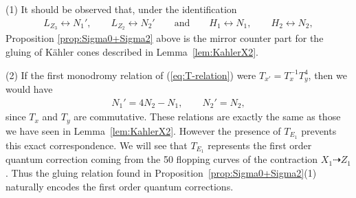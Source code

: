 \documentclass[pdftex]{sigma}
\numberwithin{equation}{section}
\begin{document}
\begin{Remark}(1) It should be observed that, under the identification
\begin{gather*}
L_{Z_{3}}\leftrightarrow N_{1}',\qquad L_{Z_{2}}\leftrightarrow N_{2}'\qquad \text{and}\qquad H_{1}\leftrightarrow N_{1},\qquad H_{2}\leftrightarrow N_{2},
\end{gather*}
Proposition \ref{prop:Sigma0+Sigma2} above is the mirror counter part for the gluing of K\"ahler cones described in Lemma~\ref{lem:KahlerX2}.

(2) If the first monodromy relation of (\ref{eq:T-relation}) were $T_{x'}=T_{x}^{-1}T_{y}^{4}$, then we would have
\begin{gather*}
N_{1}'=4N_{2}-N_{1},\qquad N_{2}'=N_{2},
\end{gather*}
since $T_{x}$ and $T_{y}$ are commutative. These relations are exactly the same as those we have seen in Lemma~\ref{lem:KahlerX2}. However the presence of $T_{E_{1}}$ prevents this exact correspondence. We will see that $T_{E_{1}}$ represents the first order quantum correction coming from the 50 flopping curves of the contraction $X_{1}\dashrightarrow Z_{1}$. Thus the gluing relation found in Proposition~\ref{prop:Sigma0+Sigma2}(1) naturally encodes the first order quantum corrections.
\end{Remark}
\end{document}
